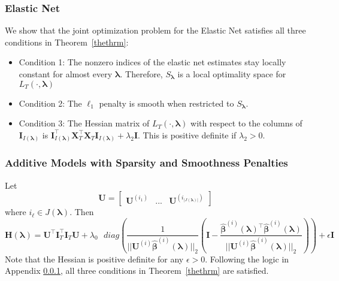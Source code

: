 \documentclass[12pt,letterpaper]{article}
\begin{document}
\subsubsection{Elastic Net}\label{enet_conditions}
We show that the joint optimization problem for the Elastic Net satisfies all three conditions in Theorem~\ref{thethrm}:
\begin{itemize}
\item[] Condition 1: The nonzero indices of the elastic net estimates stay locally constant for almost every $\boldsymbol{\lambda}$. Therefore, $S_{\boldsymbol{\lambda}}$ is a local optimality space for $L_T(\cdot, \boldsymbol{\lambda})$ \hfill {}
\item[] Condition 2: The $\ell_1$ penalty is smooth when restricted to $S_{\boldsymbol{\lambda}}$.\hfill {}
\item[] Condition 3: The Hessian matrix of $L_T(\cdot, \boldsymbol{\lambda})$ with respect to the columns of $\boldsymbol I_{I(\boldsymbol \lambda)}$ is $\boldsymbol I_{I(\boldsymbol \lambda)}^\top \boldsymbol{X}_{T}^\top \boldsymbol{X}_{T} \boldsymbol I_{I(\boldsymbol \lambda)} + \lambda_2 \boldsymbol{I}$. This is positive definite if $\lambda_2 > 0$. \hfill {}
\end{itemize}

\subsubsection{Additive Models with Sparsity and Smoothness Penalties}
Let 
\begin{equation}
\boldsymbol{U} = \begin{bmatrix}
\boldsymbol {U}^{(i_1)} & ... & \boldsymbol {U}^{(i_{|J(\boldsymbol \lambda)|})}
\end{bmatrix}
\end{equation}
where $i_\ell \in J(\boldsymbol \lambda)$. Then
\begin{equation}
\boldsymbol{H}(\boldsymbol\lambda)
= \boldsymbol{U}^\top \boldsymbol I_T^\top \boldsymbol I_T \boldsymbol{U}
+ \lambda_0 \text{ } diag \left (
\frac{1}{||\boldsymbol {U}^{(i)}  \hat{\boldsymbol{\beta}}^{(i)} (\boldsymbol \lambda)||_2} \left (
\boldsymbol I - \frac{\hat{\boldsymbol{\beta}}^{(i)} (\boldsymbol \lambda)^\top \hat{\boldsymbol{\beta}}^{(i)} (\boldsymbol \lambda)}{||\boldsymbol {U}^{(i)}  \hat{\boldsymbol{\beta}}^{(i)} (\boldsymbol \lambda)||_2}
\right ) \right )
+ \epsilon \boldsymbol I
\end{equation}
Note that the Hessian is positive definite for any $\epsilon > 0$. Following the logic in Appendix \ref{enet_conditions}, all three conditions in Theorem~\ref{thethrm} are satisfied.
\end{document}
